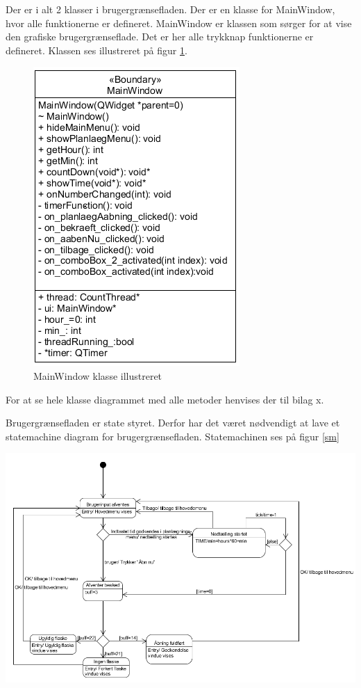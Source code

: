 Der er i alt 2 klasser i brugergrænsefladen. Der er en klasse for MainWindow, hvor alle funktionerne er defineret. MainWindow er klassen som sørger for at vise den grafiske brugergrænseflade. Det er her alle trykknap funktionerne er defineret. Klassen ses illustreret på figur \ref{MW_CD}. 

\begin{figure}[H]
	\centerline{\includegraphics[scale=1]{tex/Design/GUI/Fotos/MainWindow}}
	\caption{MainWindow klasse illustreret}
	\label{MW_CD}
\end{figure}

For at se hele klasse diagrammet med alle metoder henvises der til bilag x.

Brugergrænsefladen er state styret. Derfor har det været nødvendigt at lave et statemachine diagram for brugergrænsefladen. Statemachinen ses på figur \ref{sm}\\

\centerline{\includegraphics[scale=1]{tex/Design/GUI/Fotos/sm}}
	\caption{statemachine}
	\label{sm}


